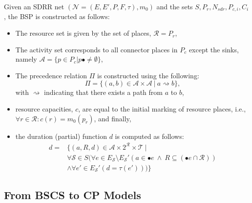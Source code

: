\begin{mydef}
	\begin{sloppypar} Given an SDRR net $(\mathcal{N} = (E, E', P, F, \tau), m_0)$ 
		and the sets $S, P_r,  N_{sdr}, P_{c,i}, C_i$,
		the BSP is constructed as follows:\end{sloppypar}
	\begin{itemize}
		\item The resource set is 
		given by the set of places, $\mathcal{R} = P_r$,
		\item The activity set corresponds to all connector places in $P_c$ except the sinks, namely $\mathcal{A} = \{p \in P_c | p\bullet \neq \emptyset \}$,
		\item The precedence
		relation $\varPi$ is constructed using
		the following: $$\varPi = \{(a,b) \in \mathcal{A} \times \mathcal{A} \ | \ a \rightsquigarrow b\},$$
		with $\rightsquigarrow$ indicating that there exists a path from $a$ to $b$,
		\item resource capacities, $c$, are equal to the
		initial marking
		of resource places, i.e., $\forall r \in \mathcal{R}: c(r) = m_0(p_r)$, and finally, 
		\item the duration (partial) function $d$ is computed as follows:
		\begin{align*} d = & \{ (a,R,d) \in \mathcal{A} \times 2^{\mathcal{R}} \times \mathcal{T} \ | \\
		& \forall \mathcal{S} \in S (\forall e \in E_{\mathcal{S}} \setminus E_{\mathcal{S}}'( a \in \bullet e  \ \land 
		\ R \subseteq (\bullet e \cap \mathcal{R})) \\ &\land \forall e' \in   E_{\mathcal{S}}' (d = \tau(e')) ) \} 
		\end{align*}	
	\end{itemize} 
\end{mydef}


\subsection{From BSCS to CP Models}


